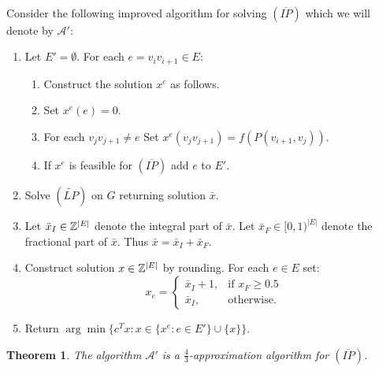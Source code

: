 \documentclass[letterpaper,12pt,oneside,onecolumn]{article}
\newcommand{\cA}{\mathcal{A}} \newcommand{\cB}{\mathcal{B}}
\newtheorem{theorem}[fact]{Theorem}
\begin{document}
\paragraph{}
Consider the following improved algorithm for solving $(\overline{IP})$ which we will denote by $\cA'$:
\begin{enumerate}
\item Let $E' = \emptyset$. For each $e=v_iv_{i+1} \in E$:
	\begin{enumerate}
	\item Construct the solution $x^{e}$ as follows.
	\item Set $x^{e}(e)=0$.
	\item For each $v_jv_{j+1} \neq e$ Set $x^{e}(v_jv_{j+1}) = f(P(v_{i+1},v_j))$.
	\item If $x^{e}$ is feasible for $(\overline{IP})$ add $e$ to $E'$.
	\end{enumerate} 
\item Solve $(\tilde{LP})$ on $G$  returning solution $\bar{x}$.
\item Let $\bar{x}_I \in \mathbb{Z}^{|E|}$ denote the integral part of $\bar{x}$. Let $\bar{x}_F \in [0,1)^{|E|}$ denote the fractional part of $\bar{x}$. Thus $\bar{x} = \bar{x}_I + \bar{x}_F.$
\item Construct solution $x \in \mathbb{Z}^{|E|}$ by rounding. For each $e \in E$ set:
$$x_e = \begin{cases}
\bar{x}_I + 1, &\text{if } x_F \geq 0.5 \\
\bar{x}_I, &\text{otherwise.}
\end{cases}$$
\item Return $\arg\min\{c^Tx : x \in \{x^e : e \in E'\} \cup \{x\}\}$.
\end{enumerate}
\begin{theorem}
The algorithm $\cA'$ is a $\frac{4}{3}$-approximation algorithm for $(\overline{IP})$.
\end{theorem}
\end{document}
